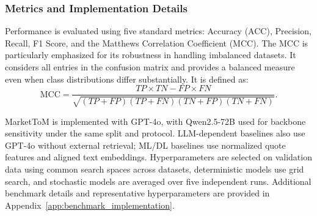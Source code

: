 \documentclass[a4paper,fleqn,doubleblind]{cas-sc}
\newcommand{\revise}[1]{{\color{blue}#1}}
\begin{document}
\subsubsection{Metrics and Implementation Details}
Performance is evaluated using five standard metrics: Accuracy (ACC), Precision, Recall, F1 Score, and the Matthews Correlation Coefficient (MCC). The MCC is particularly emphasized for its robustness in handling imbalanced datasets. It considers all entries in the confusion matrix and provides a balanced measure even when class distributions differ substantially. It is defined as:
\begin{equation}
\text{MCC} = \frac{TP \times TN - FP \times FN}{\sqrt{(TP + FP)(TP + FN)(TN + FP)(TN + FN)}}.
\end{equation}

\revise{MarketToM is implemented with GPT-4o, with Qwen2.5-72B used for backbone sensitivity under the same split and protocol. LLM-dependent baselines also use GPT-4o without external retrieval; ML/DL baselines use normalized quote features and aligned text embeddings. Hyperparameters are selected on validation data using common search spaces across datasets, deterministic models use grid search, and stochastic models are averaged over five independent runs. Additional benchmark details and representative hyperparameters are provided in Appendix~\ref{app:benchmark_implementation}.}
\end{document}
